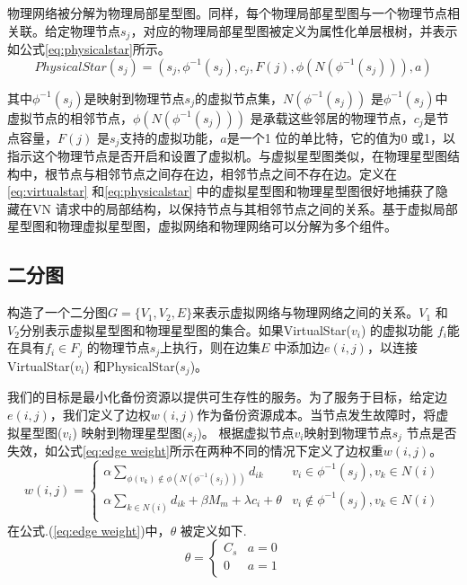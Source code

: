 物理网络被分解为物理局部星型图。同样，每个物理局部星型图与一个物理节点相关联。给定物理节点$s_j$，对应的物理局部星型图被定义为属性化单层根树，并表示如公式\ref{eq:physicalstar}所示。
\begin{equation}
PhysicalStar(s_j)=(s_j, \phi^{-1}( s_j), c_j, F(j), \phi(N(\phi^{-1}( s_j))), a)
\label{eq:physicalstar}
\end{equation}

其中$\phi^{-1}( s_j)$是映射到物理节点$s_j$的虚拟节点集，$N(\phi^{-1}( s_j))$ 是$\phi^{-1}( s_j)$中虚拟节点的相邻节点，$\phi(N(\phi^{-1}( s_j)))$ 是承载这些邻居的物理节点，$c_j$是节点容量，$F(j)$ 是$s_j$支持的虚拟功能，$a$是一个1 位的单比特，它的值为0 或1，以指示这个物理节点是否开启和设置了虚拟机。与虚拟星型图类似，在物理星型图结构中，根节点与相邻节点之间存在边，相邻节点之间不存在边。定义在\ref{eq:virtualstar} 和\ref{eq:physicalstar} 中的虚拟星型图和物理星型图很好地捕获了隐藏在VN 请求中的局部结构，以保持节点与其相邻节点之间的关系。基于虚拟局部星型图和物理虚拟星型图，虚拟网络和物理网络可以分解为多个组件。

\subsection{二分图}
构造了一个二分图$G=\{V_1,V_2,E\}$来表示虚拟网络与物理网络之间的关系。$V_1$ 和$V_2$分别表示虚拟星型图和物理星型图的集合。如果VirtualStar($v_i$) 的虚拟功能 $f_i$能在具有${f_i} \in {F_j}$ 的物理节点$s_j$上执行，则在边集$E$ 中添加边$e(i,j)$，以连接VirtualStar($v_i$) 和PhysicalStar($s_j$)。

我们的目标是最小化备份资源以提供可生存性的服务。为了服务于目标，给定边$e(i,j)$，我们定义了边权$w(i,j)$作为备份资源成本。当节点发生故障时，将虚拟星型图($v_i$) 映射到物理星型图($s_j$)。 根据虚拟节点$v_i$映射到物理节点$s_j$ 节点是否失效，如公式\ref{eq:edge weight}所示在两种不同的情况下定义了边权重$w(i,j)$。
\begin{equation}
w(i,j) = \left\{ {\begin{array}{*{20}{c}}
   { \alpha \sum\limits_{\phi ({v_k}) \notin \phi (N({\phi ^{ - 1}}({s_j})))} {{d_{ik}}} } & {{v_i} \in {\phi ^{ - 1}}({s_j}),v_k \in N(i)}  \\
   {\alpha \sum\limits_{k \in N(i)} {{d_{ik}}}  + \beta {M_m} + \lambda {c_i} + \theta } & {{v_i} \notin {\phi ^{ - 1}}({s_j}),v_k \in N(i)}  \\
\end{array}} \right.
\label{eq:edge weight}
\end{equation}
在公式.(\ref{eq:edge weight})中，$\theta$ 被定义如下.
\begin{equation}
\theta  = \left\{ {\begin{array}{*{20}{c}}
   {{C_s}} & {a = 0}  \\
   0 & {a = 1}  \\
\end{array}} \right.
\end{equation}

